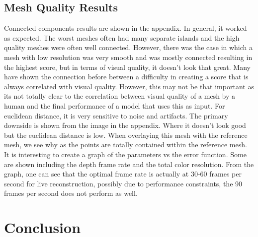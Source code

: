 \section{Mesh Quality Results}
Connected components results are shown in the appendix. In general, it worked as expected. The worst meshes often had many separate islands and the high quality meshes were often well connected. However, there was the case in which a mesh with low resolution was very smooth and was mostly connected resulting in the highest score, but in terms of visual quality, it doesn't look that great. Many have shown the connection before between a difficulty in creating a score that is always correlated with visual quality. However, this may not be that important as its not totally clear to the correlation between visual quality of a mesh by a human and the final performance of a model that uses this as input.
For euclidean distance, it is very sensitive to noise and artifacts. The primary downside is shown from the image in the appendix. Where it doesn't look good but the euclidean distance is low. When overlaying this mesh with the reference mesh, we see why as the points are totally contained within the reference mesh. It is interesting to create a graph of the parameters vs the error function. Some are shown including the depth frame rate and the total color resolution. From the graph, one can see that the optimal frame rate is actually at 30-60 frames per second for live reconstruction, possibly due to performance constraints, the 90 frames per second does not perform as well.
\chapter{Conclusion}

